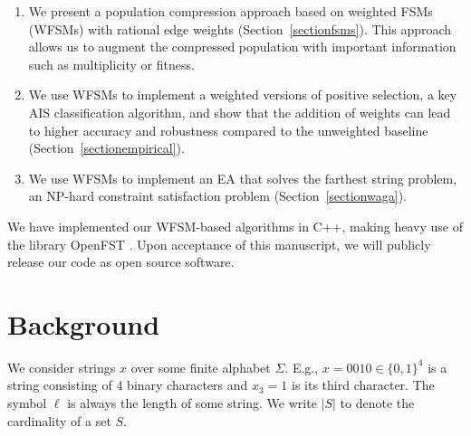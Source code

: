 \documentclass{llncs}
\begin{document}
\begin{enumerate}
\item We present a population compression approach based on weighted FSMs (WFSMs) with rational
edge weights (Section~\ref{sectionfsms}). This approach allows us to augment the compressed population with important information such as multiplicity or fitness. 
\item We use WFSMs to implement a weighted versions of positive selection, a key AIS classification algorithm, and show that the addition of weights can lead to higher accuracy and robustness compared to the unweighted baseline (Section~\ref{sectionempirical}).
\item We use WFSMs to implement an EA that solves the farthest string problem, an NP-hard constraint satisfaction problem (Section~\ref{sectionwaga}).

\end{enumerate}


We have implemented our WFSM-based algorithms in C++, making heavy use of the library OpenFST \cite{openfst}. Upon acceptance of this manuscript, we will publicly release our code as open source software. %

\section{Background}

\label{sectionbackground}

We consider strings $x$ over some finite alphabet $\Sigma$.
E.g., $x=0010 \in \{0,1\}^4$ is a string consisting of 4 binary characters and $x_3=1$ is its third character.
The symbol $\ell$ is always the length of some string.
We write $|S|$ to denote the cardinality of a set $S$.
\end{document}
